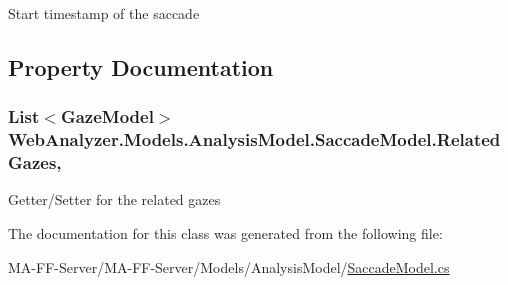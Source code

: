 Start timestamp of the saccade 



\subsection{Property Documentation}
\hypertarget{class_web_analyzer_1_1_models_1_1_analysis_model_1_1_saccade_model_a32d8fa96fd180fbbfee83b47fd8e72f9}{}
\subsubsection[{Related\+Gazes}]{\setlength{\rightskip}{0pt plus 5cm}List$<${\bf Gaze\+Model}$>$ Web\+Analyzer.\+Models.\+Analysis\+Model.\+Saccade\+Model.\+Related\+Gazes\hspace{0.3cm}{\ttfamily [get]}, {\ttfamily [set]}}\label{class_web_analyzer_1_1_models_1_1_analysis_model_1_1_saccade_model_a32d8fa96fd180fbbfee83b47fd8e72f9}


Getter/\+Setter for the related gazes 



The documentation for this class was generated from the following file\+:\begin{DoxyCompactItemize}
\item 
M\+A-\/\+F\+F-\/\+Server/\+M\+A-\/\+F\+F-\/\+Server/\+Models/\+Analysis\+Model/\hyperlink{_saccade_model_8cs}{Saccade\+Model.\+cs}\end{DoxyCompactItemize}

